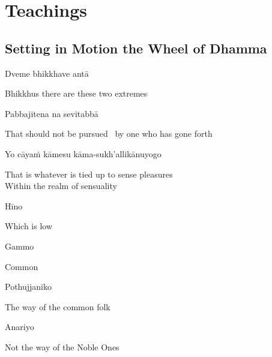 
\chapter{Teachings}

\section{Setting in Motion the Wheel of Dhamma}
\label{wheel-of-dhamma-abridged}

\begin{leader}
\end{leader}

Dveme bhikkhave antā

\begin{english}
  Bhikkhus there are these two extremes
\end{english}

Pabbajitena na sevitabbā

\begin{english}
  That should not be pursued \breathmark\ by one who has gone forth
\end{english}

Yo cāyaṁ kāmesu kāma-sukh’allikānuyogo

\begin{english}
  That is whatever is tied up to sense pleasures\\
  Within the realm of sensuality
\end{english}

Hīno

\begin{english}
  Which is low
\end{english}

Gammo

\begin{english}
  Common
\end{english}

Pothujjaniko

\begin{english}
  The way of the common folk
\end{english}

Anariyo

\begin{english}
  Not the way of the Noble Ones
\end{english}

